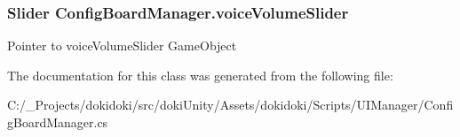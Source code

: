 \subsubsection[{\texorpdfstring{voice\+Volume\+Slider}{voiceVolumeSlider}}]{\setlength{\rightskip}{0pt plus 5cm}Slider Config\+Board\+Manager.\+voice\+Volume\+Slider}\hypertarget{class_config_board_manager_a53f4d8bcf8dc6bb0a03acafacd90875f}{}\label{class_config_board_manager_a53f4d8bcf8dc6bb0a03acafacd90875f}


Pointer to voice\+Volume\+Slider Game\+Object 



The documentation for this class was generated from the following file\+:\begin{DoxyCompactItemize}
\item 
C\+:/\+\_\+\+Projects/dokidoki/src/doki\+Unity/\+Assets/dokidoki/\+Scripts/\+U\+I\+Manager/Config\+Board\+Manager.\+cs\end{DoxyCompactItemize}
